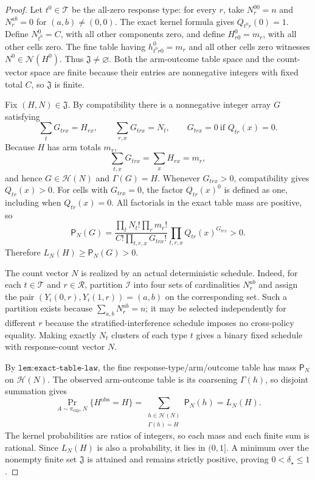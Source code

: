 \documentclass{article}
\begin{document}
\begin{proof}
Let \(t^0\in\mathcal T\) be the all-zero response type: for every \(r\), take \(N_r^{00}=n\) and \(N_r^{ab}=0\) for \((a,b)\ne(0,0)\).  The exact kernel formula gives \(Q_{t^0r}(0)=1\).  Define \(N^0_{t^0}=C\), with all other components zero, and define \(H^0_{r0}=m_r\), with all other cells zero.  The fine table having \(h^0_{t^0r0}=m_r\) and all other cells zero witnesses \(N^0\in\mathcal N(H^0)\).  Thus \(\mathfrak J\ne\varnothing\).  Both the arm-outcome table space and the count-vector space are finite because their entries are nonnegative integers with fixed total \(C\), so \(\mathfrak J\) is finite.

Fix \((H,N)\in\mathfrak J\).  By compatibility there is a nonnegative integer array \(G\) satisfying
\[
 \sum_tG_{trx}=H_{rx},\qquad
 \sum_{r,x}G_{trx}=N_t,
 \qquad
 G_{trx}=0\ \text{if }Q_{tr}(x)=0.
\]
Because \(H\) has arm totals \(m_r\),
\[
 \sum_{t,x}G_{trx}=\sum_xH_{rx}=m_r,
\]
and hence \(G\in\mathcal H(N)\) and \(\Gamma(G)=H\).  Whenever \(G_{trx}>0\), compatibility gives \(Q_{tr}(x)>0\).  For cells with \(G_{trx}=0\), the factor \(Q_{tr}(x)^0\) is defined as one, including when \(Q_{tr}(x)=0\).  All factorials in the exact table mass are positive, so
\[
 \mathsf P_N(G)
 =\frac{\prod_tN_t!\prod_rm_r!}{C!\prod_{t,r,x}G_{trx}!}
   \prod_{t,r,x}Q_{tr}(x)^{G_{trx}}>0.
\]
Therefore \(L_N(H)\ge\mathsf P_N(G)>0\).

The count vector \(N\) is realized by an actual deterministic schedule.  Indeed, for each \(t\in\mathcal T\) and \(r\in\mathcal R\), partition \(\mathcal I\) into four sets of cardinalities \(N_r^{ab}\) and assign the pair \((Y_i(0,r),Y_i(1,r))=(a,b)\) on the corresponding set.  Such a partition exists because \(\sum_{a,b}N_r^{ab}=n\); it may be selected independently for different \(r\) because the stratified-interference schedule imposes no cross-policy equality.  Making exactly \(N_t\) clusters of each type \(t\) gives a binary fixed schedule with response-count vector \(N\).

By \(\texttt{lem:exact-table-law}\), the fine response-type/arm/outcome table has mass \(\mathsf P_N\) on \(\mathcal H(N)\).  The observed arm-outcome table is its coarsening \(\Gamma(h)\), so disjoint summation gives
\[
 \Pr_{A\sim\pi_{\exp},N}\{H^{\mathrm{obs}}=H\}
 =\sum_{\substack{h\in\mathcal H(N)\\\Gamma(h)=H}}
   \mathsf P_N(h)
 =L_N(H).
\]
The kernel probabilities are ratios of integers, so each mass and each finite sum is rational.  Since \(L_N(H)\) is also a probability, it lies in \((0,1]\).  A minimum over the nonempty finite set \(\mathfrak J\) is attained and remains strictly positive, proving \(0<\delta_\star\le1\).


\end{proof}
\end{document}
